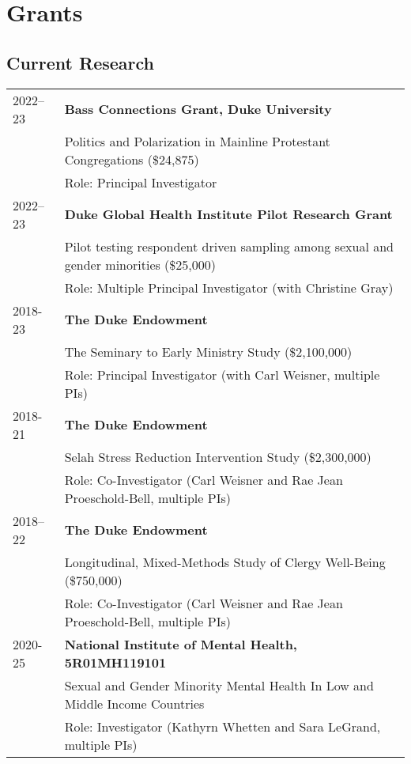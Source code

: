 \section*{Grants}
\subsection*{Current Research}
\begin{longtable}{p{} p{}}
2022--23 & \textbf{Bass Connections Grant, Duke University}\\
& Politics and Polarization in Mainline Protestant Congregations (\$24,875)\\
& Role: Principal Investigator\\

2022--23 & \textbf{Duke Global Health Institute Pilot Research Grant}\\
& Pilot testing respondent driven sampling among sexual and gender minorities (\$25,000)\\
& Role: Multiple Principal Investigator (with Christine Gray)\\

2018-23 & \textbf{The Duke Endowment}\\
& The Seminary to Early Ministry Study (\$2,100,000)\\
& Role: Principal Investigator (with Carl Weisner, multiple PIs)\\
\vspace{.2em}
2018-21 & \textbf{The Duke Endowment}\\
& Selah Stress Reduction Intervention Study (\$2,300,000)\\
& Role: Co-Investigator (Carl Weisner and Rae Jean Proeschold-Bell, multiple PIs)\\

2018--22 & \textbf{The Duke Endowment}\\
& Longitudinal, Mixed-Methods Study of Clergy Well-Being (\$750,000)\\
& Role: Co-Investigator (Carl Weisner and Rae Jean Proeschold-Bell, multiple PIs)\\

2020-25 & \textbf{National Institute of Mental Health, 5R01MH119101} \\
& Sexual and Gender Minority Mental Health In Low and Middle Income Countries \\
& Role: Investigator (Kathyrn Whetten and Sara LeGrand, multiple PIs)\\
\end{longtable}

